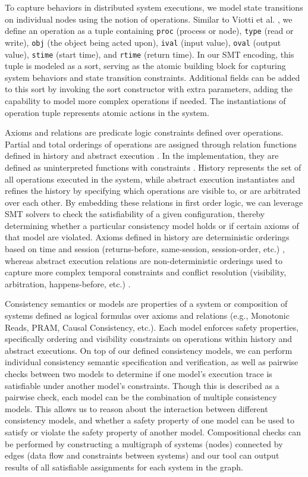 To capture behaviors in distributed system executions, we model state
transitions on individual nodes using the notion of operations.
Similar to Viotti et al. \cite{viotti2016consistency}, we define an
operation as a tuple containing \texttt{proc} (process or node),
\texttt{type} (read or write), \texttt{obj} (the object being acted
upon), \texttt{ival} (input value), \texttt{oval} (output value),
\texttt{stime} (start time), and \texttt{rtime} (return time). In our
SMT encoding, this tuple is modeled as a sort, serving as the atomic
building block for capturing system behaviors and state transition
constraints. Additional fields can be added to this sort by invoking
the sort constructor with extra parameters, adding the capability to
model more complex operations if needed. The instantiations of
operation tuple represents atomic actions in the system.

Axioms and relations are predicate logic constraints defined over
operations. Partial and total orderings of operations are assigned
through relation functions defined in history and abstract
execution \cite{burckhardt2014principles,viotti2016consistency}. In
the implementation, they are defined as uninterpreted functions with
constraints \cite{bryant2002modeling}. History represents the set of
all operations executed in the system, while abstract execution
instantiates and refines the history by specifying which operations
are visible to, or are arbitrated over each other. By embedding these
relations in first order logic, we can leverage SMT solvers to check
the satisfiability of a given configuration, thereby determining
whether a particular consistency model holds or if certain axioms of
that model are violated. Axioms defined in history are deterministic
orderings based on time and session (returns-before, same-session,
session-order, etc.) \needcite{}, whereas abstract execution
relations are non-deterministic orderings used to capture more
complex temporal constraints and conflict resolution (visibility,
arbitration, happens-before, etc.) \needcite{}.

Consistency semantics or models are properties of a system or
composition of systems defined as logical formulas over axioms and
relations (e.g., Monotonic Reads, PRAM, Causal Consistency, etc.).
Each model enforces safety properties, specifically ordering and
visibility constraints on operations within history and abstract
executions. On top of our defined consistency models, we can perform
individual consistency semantic specification and verification, as
well as pairwise checks between two models to determine if one
model's execution trace is satisfiable under another model's
constraints. Though this is described as a pairwise check, each model
can be the combination of multiple consistency models. This allows us
to reason about the interaction between different consistency models,
and whether a safety property of one model can be used to satisfy or
violate the safety property of another model. Compositional checks
can be performed by constructing a multigraph of systems (nodes)
connected by edges (data flow and constraints between systems) and
our tool can output results of all satisfiable assignments for each
system in the graph.

